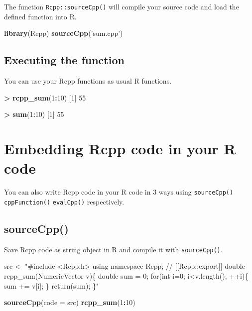 \documentclass[]{book}
\newenvironment{Shaded}{\begin{snugshade}}{\end{snugshade}}
\newcommand{\DataTypeTok}[1]{\textcolor[rgb]{0.13,0.29,0.53}{#1}}
\newcommand{\DecValTok}[1]{\textcolor[rgb]{0.00,0.00,0.81}{#1}}
\newcommand{\KeywordTok}[1]{\textcolor[rgb]{0.13,0.29,0.53}{\textbf{#1}}}
\newcommand{\NormalTok}[1]{#1}
\newcommand{\OperatorTok}[1]{\textcolor[rgb]{0.81,0.36,0.00}{\textbf{#1}}}
\newcommand{\StringTok}[1]{\textcolor[rgb]{0.31,0.60,0.02}{#1}}
\begin{document}
The function \texttt{Rcpp::sourceCpp()} will compile your source code and load the defined function into R.

\begin{Shaded}
\begin{Highlighting}[]
\KeywordTok{library}\NormalTok{(Rcpp)}
\KeywordTok{sourceCpp}\NormalTok{(}\StringTok{'sum.cpp'}\NormalTok{)}
\end{Highlighting}
\end{Shaded}

\hypertarget{executing-the-function}{%
\section{Executing the function}\label{executing-the-function}}

You can use your Rcpp functions as usual R functions.

\begin{Shaded}
\begin{Highlighting}[]
\OperatorTok{>}\StringTok{ }\KeywordTok{rcpp_sum}\NormalTok{(}\DecValTok{1}\OperatorTok{:}\DecValTok{10}\NormalTok{)}
\NormalTok{[}\DecValTok{1}\NormalTok{] }\DecValTok{55}

\OperatorTok{>}\StringTok{ }\KeywordTok{sum}\NormalTok{(}\DecValTok{1}\OperatorTok{:}\DecValTok{10}\NormalTok{)}
\NormalTok{[}\DecValTok{1}\NormalTok{] }\DecValTok{55}
\end{Highlighting}
\end{Shaded}

\hypertarget{embedding-rcpp-code-in-your-r-code}{%
\chapter{Embedding Rcpp code in your R code}\label{embedding-rcpp-code-in-your-r-code}}

You can also write Rcpp code in your R code in 3 ways using \texttt{sourceCpp()} \texttt{cppFunction()} \texttt{evalCpp()} respectively.

\hypertarget{sourcecpp}{%
\section{sourceCpp()}\label{sourcecpp}}

Save Rcpp code as string object in R and compile it with \texttt{sourceCpp()}.

\begin{Shaded}
\begin{Highlighting}[]
\NormalTok{src <-}
\StringTok{"#include <Rcpp.h>}
\StringTok{using namespace Rcpp;}
\StringTok{// [[Rcpp::export]]}
\StringTok{double rcpp_sum(NumericVector v)\{}
\StringTok{  double sum = 0;}
\StringTok{  for(int i=0; i<v.length(); ++i)\{}
\StringTok{    sum += v[i];}
\StringTok{  \}}
\StringTok{  return(sum);}
\StringTok{\}"}

\KeywordTok{sourceCpp}\NormalTok{(}\DataTypeTok{code =}\NormalTok{ src)}
\KeywordTok{rcpp_sum}\NormalTok{(}\DecValTok{1}\OperatorTok{:}\DecValTok{10}\NormalTok{)}
\end{Highlighting}
\end{Shaded}
\end{document}
